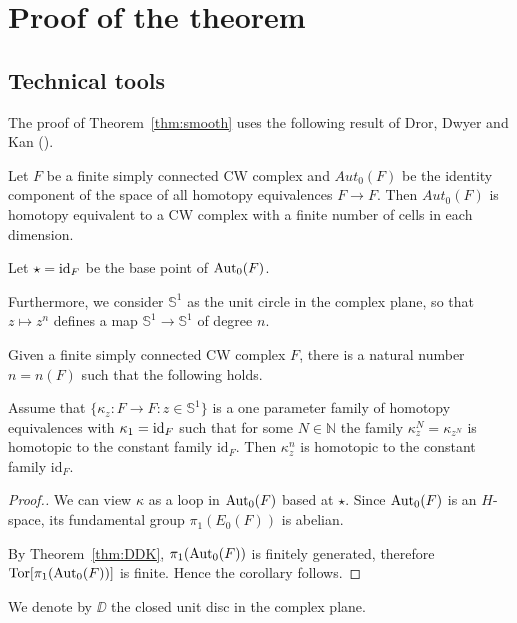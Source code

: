 \documentclass{amsart}
\begin{document}
\section*{Proof of the theorem}

\subsection{Technical tools}
The proof of Theorem~\ref{thm:smooth} uses the following result of Dror,  Dwyer and Kan (\cite{DDK}).


\begin{thm}\label{thm:DDK}
Let $F$ be a finite simply connected CW complex and 
$Aut_0(F)$ be the identity component  of the 
space of all homotopy equivalences $F\to F$. Then $Aut_0(F)$ is homotopy equivalent to a CW complex with a 
finite number of cells in each dimension.
\end{thm}

Let $\star=\operatorname{\rm id}_F$ be the base point of $\operatorname{\rm Aut}_0(F)$.

Furthermore, we consider $\mathbb{S}^1$ as the unit circle in the complex plane, so  that $z\mapsto z^n$ defines a map $\mathbb{S}^1\to \mathbb{S}^1$ of degree $n$.

\begin{cor}\label{cor:DDK}

Given a finite simply connected CW complex $F$, there is a natural number $n=n(F)$ such that the following  holds.

Assume that 
$\{\kappa_z\colon F\to F: z\in \mathbb{S}^1\}$ is a one parameter family of homotopy equivalences with $\kappa_1=\operatorname{\rm id}_F$
such that for some $N\in\mathbb{N}$ the family $\kappa^N_z=\kappa_{z^N}$ is homotopic to the constant family $\mathrm{id}_F$. 
Then $\kappa^n_z$ is homotopic to the constant family $\mathrm{id}_F$.

\end{cor}

\begin{proof}[Proof.]
We can view $\kappa$ as a loop in $\operatorname{\rm Aut}_0(F)$ based at $\star$.
Since $\operatorname{\rm Aut}_0(F)$ is an $H$-space, its fundamental group  
$\pi_1(E_0(F))$ is abelian. 

By Theorem~\ref{thm:DDK}, $\pi_1(\operatorname{\rm Aut}_0(F))$ is finitely generated,
therefore $\operatorname{Tor}[\pi_1(\operatorname{\rm Aut}_0(F))]$ is finite.
Hence the corollary follows.
\end{proof}

We denote by $\DD$ the closed unit disc in the complex plane.
\end{document}
